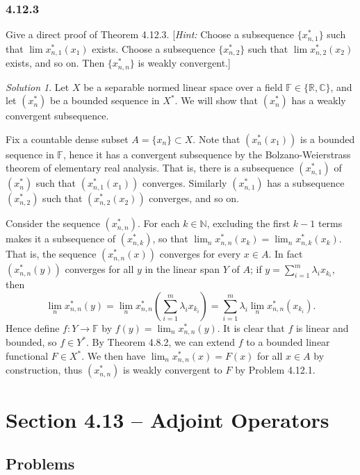 \documentclass{report}
\newcommand{\bb}[1]{\mathbb{#1}}
\theoremstyle{remark}
\newtheorem*{solution}{Solution}
\begin{document}
\subsubsection*{4.12.3}
Give a direct proof of Theorem 4.12.3. [\emph{Hint:} Choose a subsequence $\{x_{n,1}^*\}$ such that $\lim x_{n,1}^*(x_1)$ exists. Choose a subsequence $\{x_{n,2}^*\}$ such that $\lim x_{n,2}^*(x_2)$ exists, and so on. Then $\{x_{n,n}^*\}$ is weakly convergent.]

\begin{solution}
  Let $X$ be a separable normed linear space over a field $\bb F \in \{\bb R, \bb C\}$, and let $(x^*_n)$ be a bounded sequence in $X^*$. We will show that $(x^*_n)$ has a weakly convergent subsequence.

  Fix a countable dense subset $A = \{x_n\} \subset X$. Note that $(x^*_n(x_1))$ is a bounded sequence in $\bb F$, hence it has a convergent subsequence by the Bolzano-Weierstrass theorem of elementary real analysis. That is, there is a subsequence $(x^*_{n,1})$ of $(x^*_n)$ such that $(x^*_{n,1}(x_1))$ converges. Similarly $(x^*_{n,1})$ has a subsequence $(x^*_{n,2})$ such that $(x^*_{n,2}(x_2))$ converges, and so on.

  Consider the sequence $(x^*_{n,n})$. For each $k \in \bb N$, excluding the first $k-1$ terms makes it a subsequence of $(x^*_{n,k})$, so that $\lim_n x^*_{n,n}(x_k) = \lim_n x^*_{n,k}(x_k)$. That is, the sequence $(x^*_{n,n}(x))$ converges for every $x \in A$. In fact $(x^*_{n,n}(y))$ converges for all $y$ in the linear span $Y$ of $A$; if $y = \sum_{i=1}^m \lambda_i x_{k_i}$, then
  \begin{equation*}
    \lim_n x^*_{n,n}(y) = \lim_n x^*_{n,n} \left( \sum_{i=1}^m \lambda_i x_{k_i} \right) = \sum_{i=1}^m \lambda_i \lim_n x^*_{n,n}(x_{k_i}).
  \end{equation*}
  Hence define $f: Y \to \bb F$ by $f(y) = \lim_n x^*_{n,n}(y)$. It is clear that $f$ is linear and bounded, so $f \in Y^*$. By Theorem 4.8.2, we can extend $f$ to a bounded linear functional $F \in X^*$. We then have $\lim_n x^*_{n,n}(x) = F(x)$ for all $x \in A$ by construction, thus $(x^*_{n,n})$ is weakly convergent to $F$ by Problem 4.12.1.
\end{solution}

\section*{Section 4.13 -- Adjoint Operators}

\subsection*{Problems}
\end{document}
